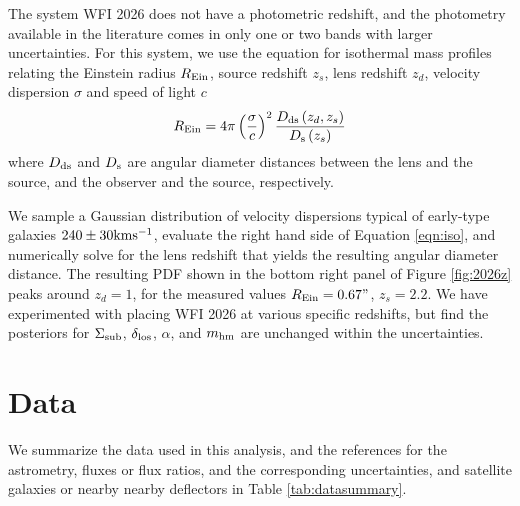 The system WFI 2026 does not have a photometric redshift, and the photometry available in the literature comes in only one or two bands with larger uncertainties. For this system, we use the equation for isothermal mass profiles relating the Einstein radius $R_{\rm{Ein}} $, source redshift $z_s$, lens redshift $z_d$, velocity dispersion $\sigma$ and speed of light $c$
\begin{equation}
\label{eqn:iso}
R_{\rm{Ein}} = 4 \pi \left(\frac{\sigma}{c}\right)^2 \frac{D_{\rm{ds}}\left(z_d, z_s\right)}{D_{\rm{s}}\left(z_s\right)}
\end{equation}
where $D_{\rm{ds}}$ and $D_{\rm{s}}$ are angular diameter distances between the lens and the source, and the observer and the source, respectively. 

We sample a Gaussian distribution of velocity dispersions typical of early-type galaxies $240 \pm 30 \rm{km} \rm{s^{-1}}$, evaluate the right hand side of Equation \ref{eqn:iso}, and numerically solve for the lens redshift that yields the resulting angular diameter distance. The resulting PDF shown in the bottom right panel of Figure \ref{fig:2026z} peaks around $z_d=1$, for the measured values $R_{\rm{Ein}}  = 0.67"$, $z_s = 2.2$. We have experimented with placing WFI 2026 at various specific redshifts, but find the posteriors for $\Sigma_{\rm{sub}}$, $\delta_{\rm{los}}$, $\alpha$, and ${m_{\rm{hm}}}$ are unchanged within the uncertainties.

\section{\bf Data}
\label{app:C}
We summarize the data used in this analysis, and the references for the astrometry, fluxes or flux ratios, and the corresponding uncertainties, and satellite galaxies or nearby nearby deflectors in Table \ref{tab:datasummary}. 


